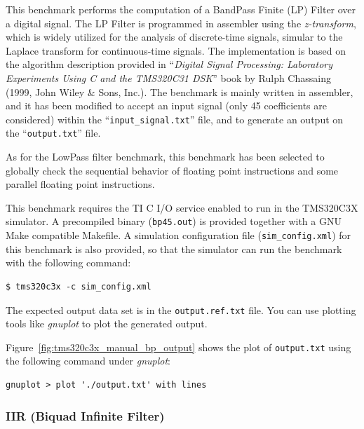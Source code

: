 This benchmark performs the computation of a BandPass Finite (LP) Filter over a digital signal.
The LP Filter is programmed in assembler using the \textit{z-transform}, which is widely utilized for the analysis of discrete-time signals, simular to the Laplace transform for continuous-time signals.
The implementation is based on the algorithm description provided in ``\textit{Digital Signal Processing: Laboratory Experiments Using C and the TMS320C31 DSK}'' book by Rulph Chassaing (1999, John Wiley \& Sons, Inc.).
The benchmark is mainly written in assembler, and it has been modified to accept an input signal (only 45 coefficients are considered) within the ``\texttt{input\_signal.txt}'' file, and to generate an output on the ``\texttt{output.txt}'' file.

As for the LowPass filter benchmark, this benchmark has been selected to globally check the sequential behavior of floating point instructions and some parallel floating point instructions.

This benchmark requires the TI C I/O service enabled to run in the TMS320C3X simulator.
A precompiled binary (\texttt{bp45.out}) is provided together with a GNU Make compatible Makefile.
A simulation configuration file (\texttt{sim\_config.xml}) for this benchmark is also provided, so that the simulator can run the benchmark with the following command:
  
\begin{verbatim}
$ tms320c3x -c sim_config.xml
\end{verbatim}

The expected output data set is in the \texttt{output.ref.txt} file.
You can use plotting tools like \textit{gnuplot} to plot the generated output. 

Figure~\ref{fig:tms320c3x_manual_bp_output} shows the plot of \texttt{output.txt} using the following command under \textit{gnuplot}:

\begin{verbatim}
gnuplot > plot './output.txt' with lines
\end{verbatim}

\subsubsection{IIR (Biquad Infinite Filter)}


